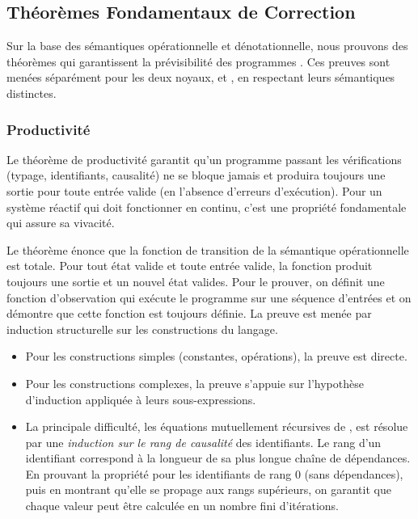 \subsection{Théorèmes Fondamentaux de Correction}

Sur la base des sémantiques opérationnelle et dénotationnelle, nous prouvons des théorèmes qui
garantissent la prévisibilité des programmes \GRust. Ces preuves sont menées séparément pour les
deux noyaux, \GRSync et \GRFRP, en respectant leurs sémantiques distinctes.

\subsubsection{Productivité}

Le théorème de productivité garantit qu'un programme \GRust passant les vérifications (typage,
identifiants, causalité) ne se bloque jamais et produira toujours une sortie pour toute entrée
valide (en l'absence d'erreurs d'exécution). Pour un système réactif qui doit fonctionner en
continu, c'est une propriété fondamentale qui assure sa vivacité.

Le théorème énonce que la fonction de transition de la sémantique opérationnelle est totale. Pour
tout état valide et toute entrée valide, la fonction produit toujours une sortie et un nouvel état
valides. Pour le prouver, on définit une fonction d'observation qui exécute le programme sur une
séquence d'entrées et on démontre que cette fonction est toujours définie.
%
La preuve est menée par induction structurelle sur les constructions du langage.
\begin{itemize}
      \item Pour les constructions simples (constantes, opérations), la preuve est directe.
      \item Pour les constructions complexes, la preuve s'appuie sur l'hypothèse d'induction
            appliquée à leurs sous-expressions.
      \item La principale difficulté, les équations mutuellement récursives de \GRSync, est résolue
            par une \emph{induction sur le rang de causalité} des identifiants. Le rang d'un
            identifiant correspond à la longueur de sa plus longue chaîne de dépendances. En
            prouvant la propriété pour les identifiants de rang 0 (sans dépendances), puis en
            montrant qu'elle se propage aux rangs supérieurs, on garantit que chaque valeur peut
            être calculée en un nombre fini d'itérations.
\end{itemize}

